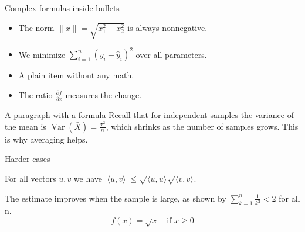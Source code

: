 \documentclass{beamer}
\begin{document}
\begin{frame}{Complex formulas inside bullets}
  \begin{itemize}
    \item The norm $\|x\| = \sqrt{x_1^2 + x_2^2}$ is always nonnegative.
    \item We minimize $\sum_{i=1}^n (y_i - \hat y_i)^2$ over all parameters.
    \item A plain item without any math.
    \item The ratio $\frac{\partial f}{\partial x}$ measures the change.
  \end{itemize}
\end{frame}

\begin{frame}{A paragraph with a formula}
  Recall that for independent samples the variance of the mean is
  $\operatorname{Var}(\bar X) = \frac{\sigma^2}{n}$, which shrinks as the number of
  samples grows. This is why averaging helps.
\end{frame}

\begin{frame}{Harder cases}
  \begin{theorem}
    For all vectors $u, v$ we have $|\langle u, v\rangle| \le \sqrt{\langle u,u\rangle}\sqrt{\langle v,v\rangle}$.
  \end{theorem}
  The estimate improves when the sample is large, as shown by
  $\sum_{k=1}^{n} \frac{1}{k^2} < 2$ for all n.
  \[
    f(x) = \sqrt{x} \quad \text{if } x \ge 0
  \]
\end{frame}
\end{document}
